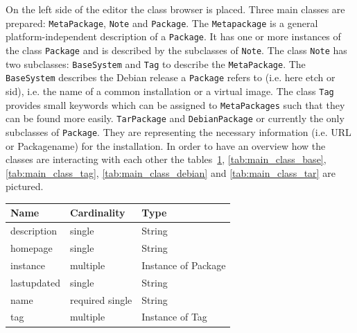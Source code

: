 On the left side of the editor the class browser is placed.  Three
main classes are prepared: \texttt{MetaPackage}, \texttt{Note}
and \texttt{Package}.  The \texttt{Metapackage} is a general
platform-independent description of a \texttt{Package}.  It has one
or more instances of the class \texttt{Package} and is described
by the subclasses of \texttt{Note}. The class \texttt{Note} has
two subclasses: \texttt{BaseSystem} and \texttt{Tag} to describe
the \texttt{MetaPackage}. The \texttt{BaseSystem} describes the
Debian release a \texttt{Package} refers to (i.e. here etch or
sid), i.e. the name of a common installation or a virtual image.
The class \texttt{Tag} provides small keywords which can be assigned
to \texttt{MetaPackages} such that they can be found more easily.
\texttt{TarPackage} and \texttt{DebianPackage} or currently the only
subclasses of \texttt{Package}.  They are representing the necessary
information (i.e. URL or Packagename) for the installation. In order
to have an overview how the classes are interacting with each other
the tables~\ref{tab:main_class_meta}, \ref{tab:main_class_base},
\ref{tab:main_class_tag}, \ref{tab:main_class_debian} and
\ref{tab:main_class_tar} are pictured.

\begin{table}[!h]
   \begin{center}
         \label{tab:main_class_meta}
	\begin{tabular}{p{3cm}p{3cm}p{4cm}}
	\textbf{Name}  & \textbf{Cardinality}  & \textbf{Type}\\
	\hline
	description    & single                & String       \\
	homepage       & single                & String       \\
	instance       & multiple              & Instance of Package       \\
	lastupdated    & single                & String       \\
	name           & required single       & String       \\
	tag            & multiple              & Instance of Tag       \\
	\end{tabular} 
   \end{center}
\end{table}


